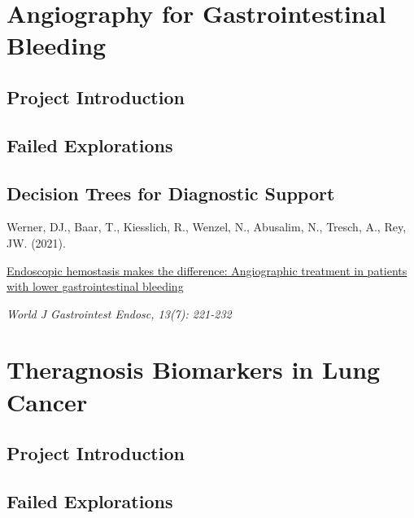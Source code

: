 \chapter{Angiography for Gastrointestinal Bleeding}

\section{Project Introduction}

\section{Failed Explorations}

\section{Decision Trees for Diagnostic Support}

\begin{tcolorbox}[
  boxrule=0pt, leftrule=1pt, colframe=s-blue, colback=white, sharp corners=all]%
  \raggedright
  Werner, DJ., Baar, T., Kiesslich, R., Wenzel, N., Abusalim, N., Tresch, A.,
  Rey, JW. (2021).
  
  \smallskip
  \href{https://www.wjgnet.com/1948-5190/full/v13/i7/221.htm}
    {Endoscopic hemostasis makes the difference: Angiographic treatment in
    patients with lower gastrointestinal bleeding}

  \smallskip
  \textit{World J Gastrointest Endosc, 13(7): 221-232}
\end{tcolorbox}


\chapter{Theragnosis Biomarkers in Lung Cancer}

\section{Project Introduction}

\section{Failed Explorations}

